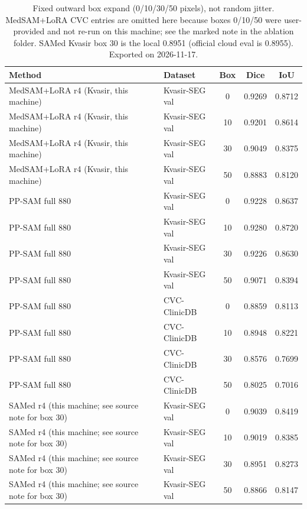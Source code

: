 \begin{table}[ht]
\centering
\caption{Fixed outward box expand (0/10/30/50 pixels), not random jitter. MedSAM+LoRA CVC entries are omitted here because boxes 0/10/50 were user-provided and not re-run on this machine; see the marked note in the ablation folder. SAMed Kvasir box 30 is the local 0.8951 (official cloud eval is 0.8955). Exported on 2026-11-17.}
\label{tab:box-expand}
\begin{tabular}{llccc}
\toprule
Method & Dataset & Box & Dice & IoU \\
\midrule
MedSAM+LoRA r4 (Kvasir, this machine) & Kvasir-SEG val & 0 & 0.9269 & 0.8712 \\
MedSAM+LoRA r4 (Kvasir, this machine) & Kvasir-SEG val & 10 & 0.9201 & 0.8614 \\
MedSAM+LoRA r4 (Kvasir, this machine) & Kvasir-SEG val & 30 & 0.9049 & 0.8375 \\
MedSAM+LoRA r4 (Kvasir, this machine) & Kvasir-SEG val & 50 & 0.8883 & 0.8120 \\
PP-SAM full 880 & Kvasir-SEG val & 0 & 0.9228 & 0.8637 \\
PP-SAM full 880 & Kvasir-SEG val & 10 & 0.9280 & 0.8720 \\
PP-SAM full 880 & Kvasir-SEG val & 30 & 0.9226 & 0.8630 \\
PP-SAM full 880 & Kvasir-SEG val & 50 & 0.9071 & 0.8394 \\
PP-SAM full 880 & CVC-ClinicDB & 0 & 0.8859 & 0.8113 \\
PP-SAM full 880 & CVC-ClinicDB & 10 & 0.8948 & 0.8221 \\
PP-SAM full 880 & CVC-ClinicDB & 30 & 0.8576 & 0.7699 \\
PP-SAM full 880 & CVC-ClinicDB & 50 & 0.8025 & 0.7016 \\
SAMed r4 (this machine; see source note for box 30) & Kvasir-SEG val & 0 & 0.9039 & 0.8419 \\
SAMed r4 (this machine; see source note for box 30) & Kvasir-SEG val & 10 & 0.9019 & 0.8385 \\
SAMed r4 (this machine; see source note for box 30) & Kvasir-SEG val & 30 & 0.8951 & 0.8273 \\
SAMed r4 (this machine; see source note for box 30) & Kvasir-SEG val & 50 & 0.8866 & 0.8147 \\

\end{tabular}
\end{table}
